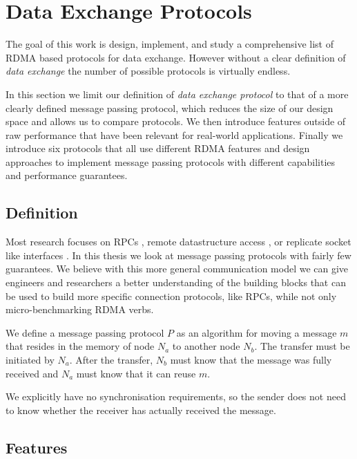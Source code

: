 \section{Data Exchange Protocols}\label{sec:protocols}
The goal of this work is design, implement, and study a comprehensive list of RDMA based protocols for data exchange. 
However without a clear definition of \emph{data exchange} the number of possible protocols is virtually endless.

In this section we limit our definition of \emph{data exchange protocol} to that of a more clearly defined message passing
protocol, which reduces the size of our design space and allows us to compare protocols. We then introduce
features outside of raw performance that have been relevant for real-world applications. Finally we introduce six 
protocols that all use different RDMA features and design approaches to implement message passing protocols with different 
capabilities and performance guarantees.

\subsection{Definition}\label{sec:proto-def}

Most research focuses on RPCs \cite{anuj-guide, fasst, herd}, remote datastructure access \cite{pilaf, farm}, or replicate 
socket like interfaces \cite{socksdirect}. In this thesis we look at message passing protocols with fairly few guarantees.
We believe with this more general communication model we can give engineers and researchers a better understanding of the 
building blocks that can be  used to build more specific connection protocols, like RPCs, while not only 
micro-benchmarking RDMA verbs.


\begin{defn}
We define a message passing protocol $P$ as an algorithm for moving a message $m$ that resides in the memory of
node $N_a$ to another node $N_b$. The transfer must be initiated by $N_a$. After the transfer, $N_b$ must know that the 
message was fully received and $N_a$ must know that it can reuse $m$.
\end{defn}

We explicitly have no synchronisation requirements, so the sender does not need to know whether the receiver has actually 
received the message.



\pagebreak

\subsection{Features} \label{sec:features} 


